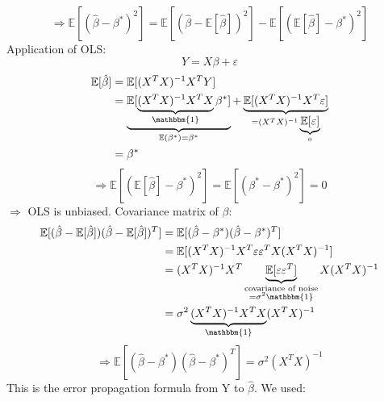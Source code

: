 \documentclass[11pt]{article}
\begin{document}
\begin{itemize}
    \begin{equation*}
      \Rightarrow \boxed{\mathbb{E}[(\hat{\beta}-\beta^*)^2] = \mathbb{E}[(
      \hat{\beta}-\mathbb{E}[\hat{\beta}])^2]-\mathbb{E}[(\mathbb{E}
      [\hat{\beta}]-\beta^*)^2]}
    \end{equation*}
    Application of OLS:
    \begin{equation*}
      Y=X\beta+\varepsilon
    \end{equation*}
    \begin{equation*}
      \begin{align*}
        \mathbb{E}[\hat{\beta}]&=\mathbb{E}[(X^TX)^{-1}X^TY] \\
        &= \underbrace{\mathbb{E}[\underbrace{(X^TX)^{-1}X^TX}_{\mathbbm{1}}\beta^*]}
        _{\mathbb{E}(\beta^*)=\beta^*}+\underbrace{\mathbb{E}[(X^TX)^{-1}X^T\varepsilon]}
        _{=(X^TX)^{-1}\underbrace{\mathbb{E}[\varepsilon]}_{0}} \\
        &= \beta^*
      \end{align*}
    \end{equation*}
    \begin{equation*}
      \Rightarrow \mathbb{E}[(\mathbb{E}[\hat{\beta}]-\beta^*)^2]=\mathbb{E}[(
      \beta^*-\beta^*)^2]=0
    \end{equation*}
    $\Rightarrow$ OLS is unbiased. Covariance matrix of $\beta$:
    \begin{equation*}
      \begin{align*}
        \mathbb{E}[(\hat{\beta}-\mathbb{E}[\hat{\beta}])(\hat{\beta}-\mathbb{E}
        [\hat{\beta}])^T] &= \mathbb{E}[(\hat{\beta}-\beta^*)(\hat{\beta}-\beta^*)^T] \\
        &= \mathbb{E}[(X^TX)^{-1}X^T\varepsilon \varepsilon^TX(X^TX)^{-1}] \\
        &= (X^TX)^{-1}X^T \underbrace{\mathbb{E}[\varepsilon \varepsilon^T]}_{\substack{\text
        {covariance of noise} \\ =\sigma^2 \mathbbm{1}}}X(X^TX)^{-1} \\
        &= \sigma^2 \underbrace{(X^TX)^{-1}X^TX}_{\mathbbm{1}}(X^TX)^{-1}
      \end{align*}
    \end{equation*}
    \begin{equation*}
      \Rightarrow \boxed{\mathbb{E}[(\hat{\beta}-\beta^*)(\hat{\beta}-\beta^*)^T]
      =\sigma^2(X^TX)^{-1}}
    \end{equation*}
    This is the error propagation formula from Y to $\hat{\beta}$. We used:

\end{itemize}
\end{document}
